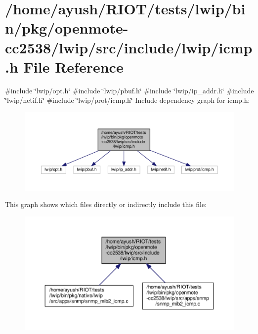 \hypertarget{openmote-cc2538_2lwip_2src_2include_2lwip_2icmp_8h}{}\section{/home/ayush/\+R\+I\+O\+T/tests/lwip/bin/pkg/openmote-\/cc2538/lwip/src/include/lwip/icmp.h File Reference}
\label{openmote-cc2538_2lwip_2src_2include_2lwip_2icmp_8h}
{\ttfamily \#include \char`\"{}lwip/opt.\+h\char`\"{}}\newline
{\ttfamily \#include \char`\"{}lwip/pbuf.\+h\char`\"{}}\newline
{\ttfamily \#include \char`\"{}lwip/ip\+\_\+addr.\+h\char`\"{}}\newline
{\ttfamily \#include \char`\"{}lwip/netif.\+h\char`\"{}}\newline
{\ttfamily \#include \char`\"{}lwip/prot/icmp.\+h\char`\"{}}\newline
Include dependency graph for icmp.\+h\+:
\nopagebreak
\begin{figure}[H]
\begin{center}
\leavevmode
\includegraphics[width=350pt]{openmote-cc2538_2lwip_2src_2include_2lwip_2icmp_8h__incl}
\end{center}
\end{figure}
This graph shows which files directly or indirectly include this file\+:
\nopagebreak
\begin{figure}[H]
\begin{center}
\leavevmode
\includegraphics[width=350pt]{openmote-cc2538_2lwip_2src_2include_2lwip_2icmp_8h__dep__incl}
\end{center}
\end{figure}
